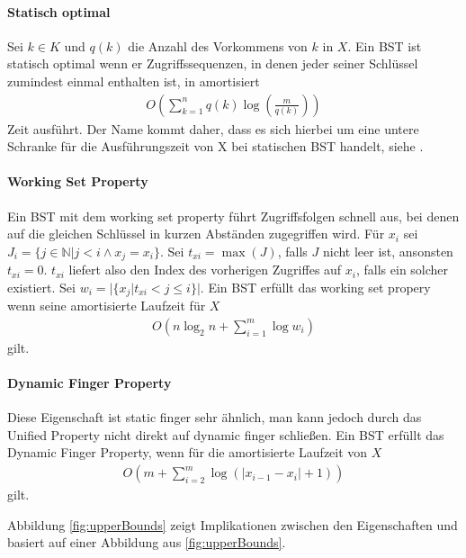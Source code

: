 \documentclass[a4paper,12pt]{article}
\begin{document}
\paragraph{Statisch optimal}
Sei $k \in K$ und $q(k)$ die Anzahl des Vorkommens von $k$ in  $X$. Ein BST ist statisch optimal wenn er Zugriffssequenzen, in denen jeder seiner Schlüssel zumindest einmal enthalten ist, in amortisiert 
\begin{align*}
O\left(\sum_{k = 1}^{n}q(k)\log \left( \frac{m}{q(k)} \right)\right) 
\end{align*}
Zeit ausführt. Der Name kommt daher, dass es sich hierbei um eine untere Schranke für die Ausführungszeit von X bei statischen BST handelt, siehe \cite{staticOptimal}.

\paragraph{Working Set Property}
Ein BST mit dem working set property führt Zugriffsfolgen schnell aus, bei denen auf die gleichen Schlüssel in kurzen Abständen zugegriffen wird.
Für $x_i$ sei $J_i = \{j \in \mathbb{N} \vert j < i \land x_j = x_i \}$.
Sei $t_{xi} = \max \left(J\right)$, falls $J$ nicht leer ist, ansonsten $t_{xi} = 0$. $t_{xi}$ liefert also den Index des vorherigen Zugriffes auf $x_i$, falls ein solcher existiert. Sei ${w_i = \vert\{x_j \vert t_{xi} < j \leq i   \} \vert }$.
Ein BST erfüllt das working set propery wenn seine amortisierte Laufzeit für $X$
\begin{align*}
O\left(n \log_2 n + \sum_{i = 1}^{m} \log w_i \right)
\end{align*} 
gilt. 


\paragraph{Dynamic Finger Property}
Diese Eigenschaft ist static finger sehr ähnlich, man kann jedoch durch das Unified Property nicht direkt auf dynamic finger schließen. 
Ein BST erfüllt das Dynamic Finger Property, wenn für die amortisierte Laufzeit von $X$
\begin{align*}
O\left( m + \sum_{i = 2}^{m} \log \left(\vert x_{i-1} - x_i  \vert	+ 1	\right)\right)
\end{align*} 
gilt. 

\noindent Abbildung \ref{fig:upperBounds} zeigt Implikationen zwischen den Eigenschaften und basiert auf einer Abbildung aus \ref{fig:upperBounds}.
\end{document}
